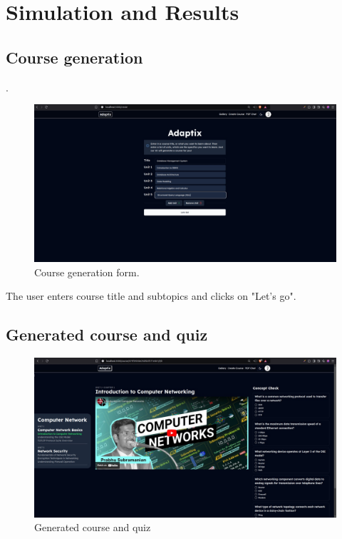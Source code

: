 
\chapter{Simulation and Results} %

\label{Chapter4} 

\section{Course generation}.

\begin{figure}[h!]
    \centering
    \includegraphics[scale=0.3]{Images/adaptrix-course-gen.jpeg}    
    \caption{Course generation form.}
    \label{fig:course-gen-form}
\end{figure}

The user enters course title and subtopics and clicks on "Let's go".

\section{Generated course and quiz}
\begin{figure}[h!]
    \centering
    \includegraphics[scale=0.28]{Images/couse-and-quiz.jpeg}
    \caption{Generated course and quiz}
    \label{fig:generated-course}
\end{figure}

